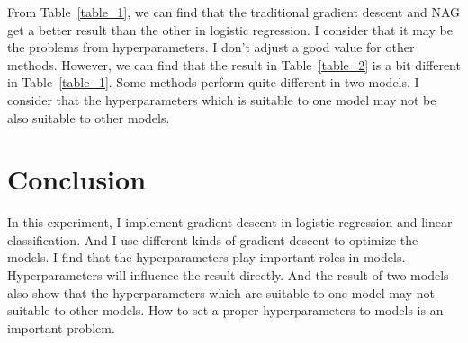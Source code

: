 \documentclass[journal, a4paper]{IEEEtran}
\begin{document}
From Table~\ref{table_1}, we can find that the traditional gradient descent and NAG get a better result than the other in logistic regression. I consider that it may be the problems from hyperparameters. I don't adjust a good value for other methods. However, we can find that the result in Table~\ref{table_2} is a bit different in Table~\ref{table_1}. Some methods perform quite different in two models. I consider that the hyperparameters which is suitable to one model may not be also suitable to other models.

\section{Conclusion}
In this experiment, I implement gradient descent in logistic regression and linear classification. And I use different kinds of gradient descent to optimize the models. I find that the hyperparameters play important roles in models. Hyperparameters will influence the result directly. And the result of two models also show that the hyperparameters which are suitable to one model may not suitable to other models. How to set a proper hyperparameters to models is an important problem.

\end{document}

